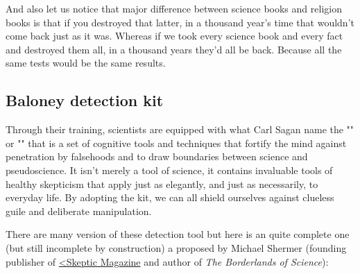 	And also let us notice that major difference between science books and religion books is that if you destroyed that latter, in a thousand year's time that wouldn't come back just as it was. Whereas if we took every science book and every fact and destroyed them all, in a thousand years they'd all be back. Because all the same tests would be the same results.
	
	\pagebreak
	\subsection{Baloney detection kit}
	Through their training, scientists are equipped with what Carl Sagan name the "" or "" that is a set of cognitive tools and techniques that fortify the mind against penetration by falsehoods and to draw boundaries between science and pseudoscience. It isn't merely a tool of science, it contains invaluable tools of healthy skepticism that apply just as elegantly, and just as necessarily, to everyday life. By adopting the kit, we can all shield ourselves against clueless guile and deliberate manipulation. 

	There are many version of these detection tool but here is an quite complete one (but still incomplete by construction) a proposed by Michael Shermer (founding publisher of \href{http://www.skeptic.com}{<Skeptic Magazine} and author of \textit{The Borderlands of Science}):
	

